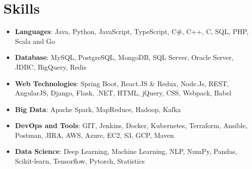\documentclass[letterpaper,10.8pt]{article}
\newcommand{\resumeItem}[2]{
  \item\small{
    \textbf{#1}{: #2 \vspace{-2pt}}
  }
}
\newcommand{\resumeSubItem}[2]{\resumeItem{#1}{#2}\vspace{-4pt}}
\newcommand{\resumeSubHeadingListStart}{\begin{itemize}[leftmargin=*]}
\newcommand{\resumeSubHeadingListEnd}{\end{itemize}}
\begin{document}

%

\section{Skills}
\resumeSubHeadingListStart
\resumeSubItem{Languages}{Java, Python, JavaScript, TypeScript, C\#, C++, C, SQL, PHP, Scala and Go  }
\vspace{1.5pt}
\resumeSubItem{Database}{MySQL, PostgreSQL, MongoDB, SQL Server, Oracle Server, JDBC, BigQuery, Redis }
\vspace{1.5pt}
\resumeSubItem{Web Technologies}{Spring Boot, React.JS \& Redux, Node.Js, REST, AngularJS, Django, Flask, .NET, HTML, jQuery, CSS, Webpack, Babel}
\vspace{1.5pt}
\resumeSubItem{Big Data}{Apache Spark, MapReduce, Hadoop, Kafka}
\vspace{1.5pt}
\resumeSubItem{DevOps and Tools}{GIT, Jenkins, Docker, Kubernetes, Terraform, Ansible, Postman, JIRA, AWS, Azure, EC2, S3, GCP, Maven}
\vspace{1.5pt}
\resumeSubItem{Data Science}{Deep Learning, Machine Learning, NLP, NumPy, Pandas,  Scikit-learn, Tensorflow, Pytorch, Statistics}
\resumeSubHeadingListEnd
\end{document}
